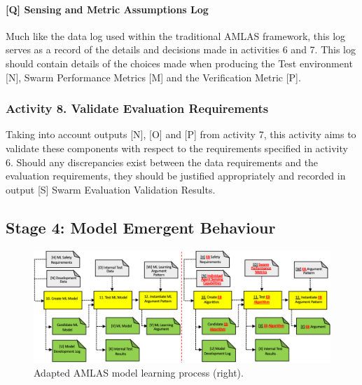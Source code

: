 \documentclass[lettersize,journal]{IEEEtran}
\begin{document}

\paragraph*{[Q] Sensing and Metric Assumptions Log}

Much like the data log used within the traditional AMLAS framework, this log serves as a record of the details and decisions made in activities 6 and 7. This log should contain details of the choices made when producing the Test environment [N], Swarm Performance Metrics [M] and the Verification Metric [P].

\subsubsection*{Activity 8. Validate Evaluation Requirements}

Taking into account outputs [N], [O] and [P] from activity 7, this activity aims to validate these components with respect to the requirements specified in activity 6. Should any discrepancies exist between the data requirements and the evaluation requirements, they should be justified appropriately and recorded in output [S] Swarm Evaluation Validation Results.

\subsection{Stage 4: Model Emergent Behaviour} \label{framework-stage4}


\begin{figure}
	\centering
	\includegraphics[width=1.0\textwidth]{figures/amlas-a-stage4.png}
	\caption{Adapted AMLAS model learning process (right).}
	\label{amlas-a-stage4}
\end{figure}
\end{document}
